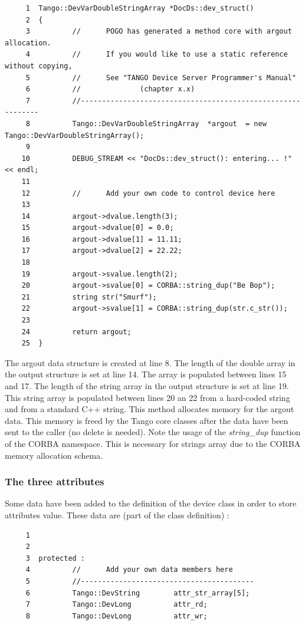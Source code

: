 \begin{verbatim}
     1  Tango::DevVarDoubleStringArray *DocDs::dev_struct()
     2  {
     3          //      POGO has generated a method core with argout allocation.
     4          //      If you would like to use a static reference without copying,
     5          //      See "TANGO Device Server Programmer's Manual"
     6          //              (chapter x.x)
     7          //------------------------------------------------------------
     8          Tango::DevVarDoubleStringArray  *argout  = new Tango::DevVarDoubleStringArray();
     9  
    10          DEBUG_STREAM << "DocDs::dev_struct(): entering... !" << endl;
    11          
    12          //      Add your own code to control device here
    13  
    14          argout->dvalue.length(3);
    15          argout->dvalue[0] = 0.0;
    16          argout->dvalue[1] = 11.11;
    17          argout->dvalue[2] = 22.22;
    18          
    19          argout->svalue.length(2);
    20          argout->svalue[0] = CORBA::string_dup("Be Bop");
    21          string str("Smurf");
    22          argout->svalue[1] = CORBA::string_dup(str.c_str());
    23          
    24          return argout;
    25  }
\end{verbatim}


The argout data structure is created at line 8. The length of the
double array in the output structure is set at line 14. The array
is populated between lines 15 and 17. The length of the string array
in the output structure is set at line 19. This string array is populated
between lines 20 an 22 from a hard-coded string and from a standard
C++ string. This method allocates memory for the argout
data. This memory is freed by the Tango core classes after the data
have been sent to the caller (no delete is needed). Note the usage
of the \emph{string\_dup} function of the CORBA
namespace. This is necessary for strings array due to the CORBA memory
allocation schema.


\subsubsection{The three attributes}

Some data have been added to the definition of the device class in
order to store attributes value. These data are (part of the class
definition) :


\begin{verbatim}
     1  
     2  
     3  protected :     
     4          //      Add your own data members here
     5          //-----------------------------------------
     6          Tango::DevString        attr_str_array[5];
     7          Tango::DevLong          attr_rd;
     8          Tango::DevLong          attr_wr;
\end{verbatim}


